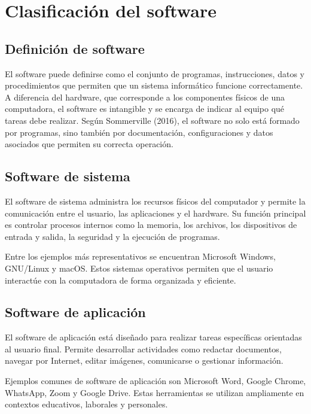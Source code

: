 \documentclass[12pt,a4paper]{article}
\begin{document}
	\section{Clasificación del software}
	
	\subsection{Definición de software}
	
	El software puede definirse como el conjunto de programas, instrucciones, datos y procedimientos que permiten que un sistema informático funcione correctamente. A diferencia del hardware, que corresponde a los componentes físicos de una computadora, el software es intangible y se encarga de indicar al equipo qué tareas debe realizar. Según Sommerville (2016), el software no solo está formado por programas, sino también por documentación, configuraciones y datos asociados que permiten su correcta operación.
	
	\subsection{Software de sistema}
	
	El software de sistema administra los recursos físicos del computador y permite la comunicación entre el usuario, las aplicaciones y el hardware. Su función principal es controlar procesos internos como la memoria, los archivos, los dispositivos de entrada y salida, la seguridad y la ejecución de programas.
	
	Entre los ejemplos más representativos se encuentran Microsoft Windows, GNU/Linux y macOS. Estos sistemas operativos permiten que el usuario interactúe con la computadora de forma organizada y eficiente.
	
	\subsection{Software de aplicación}
	
	El software de aplicación está diseñado para realizar tareas específicas orientadas al usuario final. Permite desarrollar actividades como redactar documentos, navegar por Internet, editar imágenes, comunicarse o gestionar información.
	
	Ejemplos comunes de software de aplicación son Microsoft Word, Google Chrome, WhatsApp, Zoom y Google Drive. Estas herramientas se utilizan ampliamente en contextos educativos, laborales y personales.
	
\end{document}
